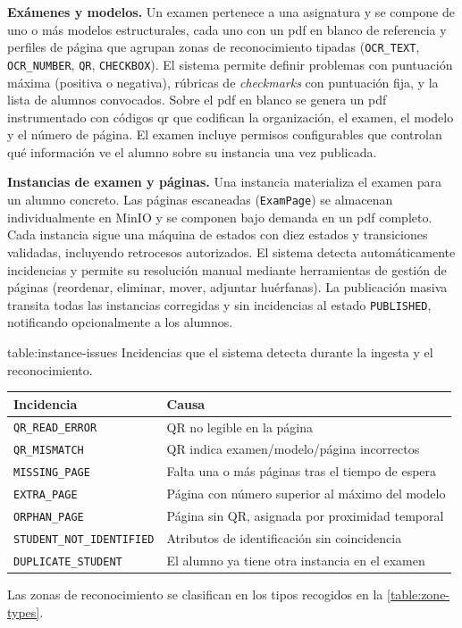 \begin{functional}
  \item \textbf{Exámenes y modelos.}
  \label{rf:exams}
  Un examen pertenece a una asignatura y se compone de uno o más
  modelos estructurales, cada uno con un \acs{pdf} en blanco de
  referencia y perfiles de página que agrupan zonas de reconocimiento
  tipadas (\texttt{OCR\_TEXT}, \texttt{OCR\_NUMBER}, \texttt{QR},
  \texttt{CHECKBOX}). El sistema permite definir problemas con
  puntuación máxima (positiva o negativa), rúbricas de
  \textit{checkmarks} con puntuación fija, y la lista de alumnos
  convocados. Sobre el \acs{pdf} en blanco se genera un \acs{pdf}
  instrumentado con códigos \acs{qr} que codifican la organización, el
  examen, el modelo y el número de página. El examen incluye permisos
  configurables que controlan qué información ve el alumno sobre su
  instancia una vez publicada.

  \item \textbf{Instancias de examen y páginas.}
  \label{rf:instances}
  Una instancia materializa el examen para un alumno concreto. Las
  páginas escaneadas (\texttt{ExamPage}) se almacenan individualmente
  en MinIO y se componen bajo demanda en un \acs{pdf} completo. Cada
  instancia sigue una máquina de estados con diez estados y
  transiciones validadas, incluyendo retrocesos autorizados. El sistema
  detecta automáticamente incidencias y permite su resolución
  manual mediante herramientas de gestión de páginas (reordenar,
  eliminar, mover, adjuntar huérfanas). La publicación masiva transita
  todas las instancias corregidas y sin incidencias al estado
  \texttt{PUBLISHED}, notificando opcionalmente a los alumnos.
  \begin{table}[Tipos de incidencia]{table:instance-issues}{%
      Incidencias que el sistema detecta durante la ingesta y el
      reconocimiento.}
    \small
    \renewcommand{\arraystretch}{1.2}
    \begin{tabular}{l p{8.5cm}}
      \hline
      \textbf{Incidencia} & \textbf{Causa} \\
      \hline
      \texttt{QR\_READ\_ERROR}       & QR no legible en la página \\
      \texttt{QR\_MISMATCH}          & QR indica examen/modelo/página incorrectos \\
      \texttt{MISSING\_PAGE}         & Falta una o más páginas tras el tiempo de espera \\
      \texttt{EXTRA\_PAGE}           & Página con número superior al máximo del modelo \\
      \texttt{ORPHAN\_PAGE}          & Página sin QR, asignada por proximidad temporal \\
      \texttt{STUDENT\_NOT\_IDENTIFIED} & Atributos de identificación sin coincidencia \\
      \texttt{DUPLICATE\_STUDENT}    & El alumno ya tiene otra instancia en el examen \\
      \hline
    \end{tabular}
  \end{table}
  Las zonas de reconocimiento se clasifican en los tipos recogidos en la
  \cref{table:zone-types}.


\end{functional}
